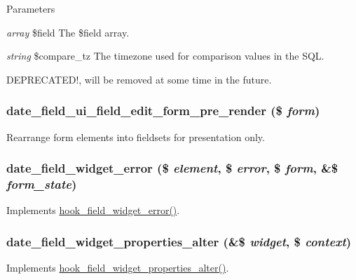 \begin{DoxyParams}{Parameters}
\item[{\em array}]\$field The \$field array. \item[{\em string}]\$compare\_\-tz The timezone used for comparison values in the SQL.\end{DoxyParams}
DEPRECATED!, will be removed at some time in the future. \hypertarget{date_8module_aa7dfa6775921c3fbf7f8ceae70f6f519}{
\subsubsection[{date\_\-field\_\-ui\_\-field\_\-edit\_\-form\_\-pre\_\-render}]{\setlength{\rightskip}{0pt plus 5cm}date\_\-field\_\-ui\_\-field\_\-edit\_\-form\_\-pre\_\-render (\$ {\em form})}}
\label{date_8module_aa7dfa6775921c3fbf7f8ceae70f6f519}
Rearrange form elements into fieldsets for presentation only. \hypertarget{date_8module_a227ffb57a05af9ccef60099ad0915228}{
\subsubsection[{date\_\-field\_\-widget\_\-error}]{\setlength{\rightskip}{0pt plus 5cm}date\_\-field\_\-widget\_\-error (\$ {\em element}, \/  \$ {\em error}, \/  \$ {\em form}, \/  \&\$ {\em form\_\-state})}}
\label{date_8module_a227ffb57a05af9ccef60099ad0915228}
Implements \hyperlink{group__field__widget_ga9a2031578542fef9e296d79c946431fd}{hook\_\-field\_\-widget\_\-error()}. \hypertarget{date_8module_afe34456f5b7c190e42133c211d76b42e}{
\subsubsection[{date\_\-field\_\-widget\_\-properties\_\-alter}]{\setlength{\rightskip}{0pt plus 5cm}date\_\-field\_\-widget\_\-properties\_\-alter (\&\$ {\em widget}, \/  \$ {\em context})}}
\label{date_8module_afe34456f5b7c190e42133c211d76b42e}
Implements \hyperlink{group__field__widget_gaa88988bce1ffbec1f481ec7a3ba87e51}{hook\_\-field\_\-widget\_\-properties\_\-alter()}.

